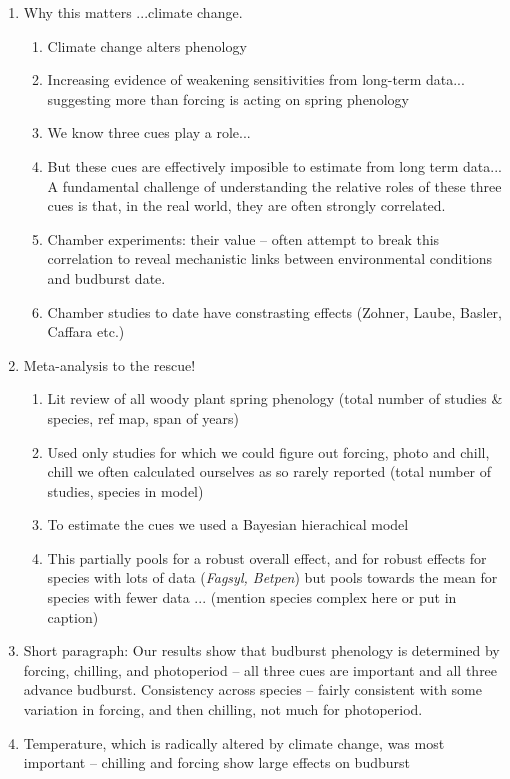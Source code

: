 \documentclass[11pt,letter]{article}
\begin{document}
\begin{enumerate}
\item Why this matters ...climate change.
\begin{enumerate}
\item Climate change alters phenology
\item Increasing evidence of weakening sensitivities from long-term data... suggesting more than forcing is acting on spring phenology
\item We know three cues play a role...
\item But these cues are effectively imposible to estimate from long term data... A fundamental challenge of understanding the relative roles of these three cues is that, in the real world, they are often strongly correlated. 
\item Chamber experiments: their value --  often attempt to break this correlation to reveal mechanistic links between environmental conditions and budburst date. 
\item Chamber studies to date have constrasting effects (Zohner, Laube, Basler, Caffara etc.)
\end{enumerate}
\item Meta-analysis to the rescue!
\begin{enumerate}
\item Lit review of all woody plant spring phenology (total number of studies \& species, ref map, span of years)
\item Used only studies for which we could figure out forcing, photo and chill, chill we often calculated ourselves as so rarely reported (total number of studies, species in model)
\item To estimate the cues we used a Bayesian hierachical model 
\item This partially pools for a robust overall effect, and for robust effects for species with lots of data (\emph{Fagsyl, Betpen}) but pools towards the mean for species with fewer data ... (mention species complex here or put in caption)
\end{enumerate}
\item Short paragraph: Our results show that budburst phenology is determined by forcing, chilling, and photoperiod -- all three cues are important and all three advance budburst. Consistency across species -- fairly consistent with some variation in forcing, and then chilling, not much for photoperiod. 
\item Temperature, which is radically altered by climate change, was most important -- chilling and forcing show large effects on budburst

\end{enumerate}
\end{document}
